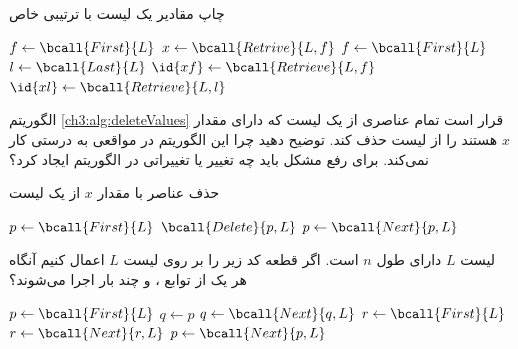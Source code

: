 \begin{algorithm}
\caption{چاپ مقادیر یک لیست با ترتیبی خاص}\label{ch3:alg:printList}
\begin{latin}
\begin{algorithmic}[1]
				\State	\Return
		\EndIf
				\State	$f \gets \bcall{First}{L}$
				\State	$x \gets \bcall{Retrive}{L,f}$
				\State	{}
		\Else
				\State	$f \gets \bcall{First}{L}$
				\State	$l \gets \bcall{Last}{L}$
				\State	$\id{xf} \gets \bcall{Retrieve}{L,f}$
				\State	$\id{xl} \gets \bcall{Retrieve}{L,l}$
				\State	{}
				\State	{}
				\State	{}
				\State	{}				
				\State	{}	
		\EndIf		
\EndProcedure
\end{algorithmic}
\end{latin}
\end{algorithm}

 الگوریتم {\eqref{ch3:alg:deleteValues}} قرار است تمام عناصری از یک لیست که دارای مقدار {$x$} هستند را از لیست حذف کند. توضیح دهید چرا این الگوریتم در مواقعی به درستی کار نمی‌کند. برای رفع مشکل باید چه تغییر یا تغییراتی در الگوریتم ایجاد کرد؟

\begin{algorithm}
\caption{حذف عناصر با مقدار {$x$} از یک لیست}\label{ch3:alg:deleteValues}
\begin{latin}
\begin{algorithmic}[1]
	\State	$p \gets \bcall{First}{L}$
			\State	$\bcall{Delete}{p,L}$
		\EndIf
		\State	$p \gets \bcall{Next}{p,L}$	
	\EndWhile
\EndProcedure
\end{algorithmic}
\end{latin}
\end{algorithm}


 لیست {$L$} دارای طول {$n$} است. اگر قطعه کد زیر را بر روی لیست {$L$} اعمال کنیم آنگاه هر یک از توابع {}، {} و {} چند بار اجرا می‌شوند؟

\begin{latin}
\begin{algorithmic}[1]
	\State	$p \gets \bcall{First}{L}$
		\State	$q \gets p$
			\State	$q \gets \bcall{Next}{q,L}$		
			\State	$r \gets \bcall{First}{L}$			
				\State	$r \gets \bcall{Next}{r,L}$					
			\EndWhile
		\EndWhile
		\State	$p \gets \bcall{Next}{p,L}$			
	\EndWhile
\end{algorithmic}
\end{latin}

